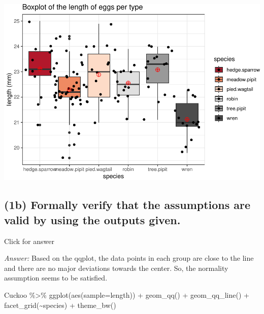 \documentclass[
]{book}
\newenvironment{Shaded}{\begin{snugshade}}{\end{snugshade}}
\newcommand{\AttributeTok}[1]{\textcolor[rgb]{0.77,0.63,0.00}{#1}}
\newcommand{\FunctionTok}[1]{\textcolor[rgb]{0.00,0.00,0.00}{#1}}
\newcommand{\NormalTok}[1]{#1}
\newcommand{\SpecialCharTok}[1]{\textcolor[rgb]{0.00,0.00,0.00}{#1}}
\begin{document}
\includegraphics[width=1\linewidth]{Class_Activity_24_files/figure-latex/unnamed-chunk-2-1}

\hypertarget{b-formally-verify-that-the-assumptions-are-valid-by-using-the-outputs-given.}{%
\subsection{(1b) Formally verify that the assumptions are valid by using the outputs given.}\label{b-formally-verify-that-the-assumptions-are-valid-by-using-the-outputs-given.}}

Click for answer

\emph{Answer:} Based on the qqplot, the data points in each group are close to the line and there are no major deviations towards the center. So, the normality assumption seems to be satisfied.

\begin{Shaded}
\begin{Highlighting}[]
\NormalTok{Cuckoo }\SpecialCharTok{\%\textgreater{}\%} 
  \FunctionTok{ggplot}\NormalTok{(}\FunctionTok{aes}\NormalTok{(}\AttributeTok{sample=}\NormalTok{length)) }\SpecialCharTok{+} \FunctionTok{geom\_qq}\NormalTok{() }\SpecialCharTok{+} \FunctionTok{geom\_qq\_line}\NormalTok{() }\SpecialCharTok{+} \FunctionTok{facet\_grid}\NormalTok{(}\SpecialCharTok{\textasciitilde{}}\NormalTok{species) }\SpecialCharTok{+}  \FunctionTok{theme\_bw}\NormalTok{() }
\end{Highlighting}
\end{Shaded}
\end{document}
